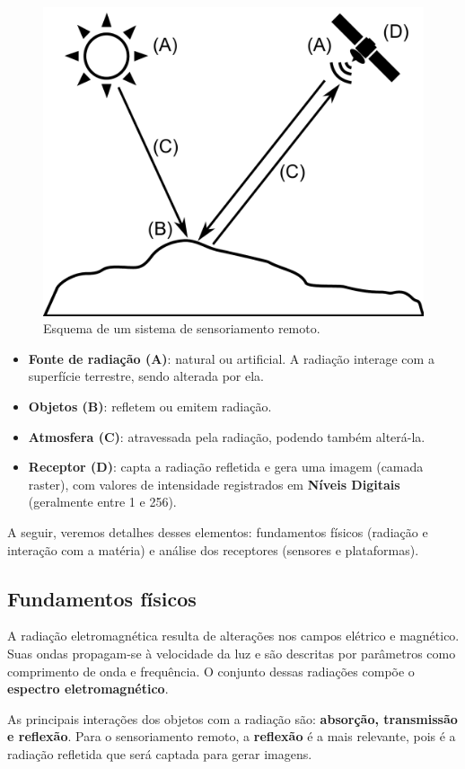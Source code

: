 \begin{figure}[!hbt]   
\centering
\includegraphics[width=.6\textwidth]{Fontes_dados/Elementos_teledeteccion.pdf}
\caption{\small Esquema de um sistema de sensoriamento remoto.}
\label{Fig:Elementos_teledeteccion} 
\end{figure}

\begin{itemize}
	\item \textbf{Fonte de radiação (A)}: natural ou artificial. A radiação interage com a superfície terrestre, sendo alterada por ela.
	\item \textbf{Objetos (B)}: refletem ou emitem radiação.
	\item \textbf{Atmosfera (C)}: atravessada pela radiação, podendo também alterá-la.
	\item \textbf{Receptor (D)}: capta a radiação refletida e gera uma imagem (camada raster), com valores de intensidade registrados em \textbf{Níveis Digitais} (geralmente entre 1 e 256).
\end{itemize}

A seguir, veremos detalhes desses elementos: fundamentos físicos (radiação e interação com a matéria) e análise dos receptores (sensores e plataformas).

\subsection{Fundamentos físicos}

A radiação eletromagnética resulta de alterações nos campos elétrico e magnético. Suas ondas propagam-se à velocidade da luz e são descritas por parâmetros como comprimento de onda e frequência. O conjunto dessas radiações compõe o \textbf{espectro eletromagnético}.

As principais interações dos objetos com a radiação são: \textbf{absorção, transmissão e reflexão}. Para o sensoriamento remoto, a \textbf{reflexão} é a mais relevante, pois é a radiação refletida que será captada para gerar imagens.

